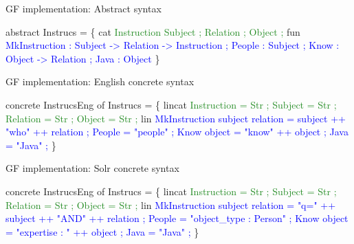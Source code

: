 \begin{frame}[fragile]{GF implementation: Abstract syntax}\pause
\begin{semiverbatim}
abstract Instrucs = \{
  cat \textcolor{ForestGreen}{
    Instruction 
    Subject ;
    Relation ;
    Object ; }\pause
  fun \textcolor{Blue}{
    MkInstruction : Subject -> Relation -> Instruction ;
    People : Subject ;
    Know : Object -> Relation ;
    Java : Object }
\}
\end{semiverbatim}
\end{frame}

\begin{frame}[fragile]{GF implementation: English concrete syntax}\pause
\begin{semiverbatim}
concrete InstrucsEng of Instrucs = \{
  lincat \textcolor{ForestGreen}{
    Instruction = \textcolor{Type}{Str} ;
    Subject = \textcolor{Type}{Str} ;
    Relation = \textcolor{Type}{Str} ;
    Object = \textcolor{Type}{Str} ; }\pause
  lin \textcolor{Blue}{
    MkInstruction subject relation = 
                   subject ++ \textcolor{String}{"who"} ++ relation ;
    People = \textcolor{String}{"people"} ;
    Know object = \textcolor{String}{"know"} ++ object ;
    Java = \textcolor{String}{"Java"} ; }
\}
\end{semiverbatim}
\end{frame}

\begin{frame}[fragile]{GF implementation: Solr concrete syntax}\pause
\begin{semiverbatim}
concrete InstrucsEng of Instrucs = \{
  lincat \textcolor{ForestGreen}{
    Instruction = \textcolor{Type}{Str} ;
    Subject = \textcolor{Type}{Str} ;
    Relation = \textcolor{Type}{Str} ;
    Object = \textcolor{Type}{Str} ;}\pause
  lin \textcolor{Blue}{
    MkInstruction subject relation = 
                   \textcolor{String}{"q="} ++ subject ++ \textcolor{String}{"AND"} ++ relation ;
    People = \textcolor{String}{"object_type : Person"} ;
    Know object = \textcolor{String}{"expertise : "} ++ object ;
    Java = \textcolor{String}{"Java"} ; }
\}
\end{semiverbatim}
\end{frame}

